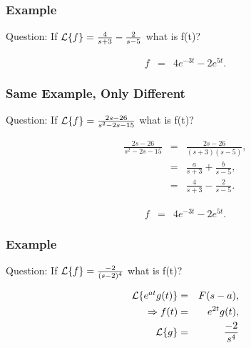 \begin{frame}
  \frametitle{Example}

  \begin{block}{Question:}
    If $\laplace{f} = \frac{4}{s+3}-\frac{2}{s-5}$ what is f(t)?
  \end{block}

  {
    \begin{eqnarray*}
      f & = & 4 e^{-3t} - 2 e^{5t}.
    \end{eqnarray*}
  }

\end{frame}


\begin{frame}
  \frametitle{Same Example, Only Different}

  \begin{block}{Question:}
    If $\laplace{f} = \frac{2s-26}{s^2-2s-15}$ what is f(t)?
  \end{block}

  {
    \begin{eqnarray*}
      \frac{2s-26}{s^2-2s-15} & = & \frac{2s-26}{(s+3)(s-5)}, \\
      & = & \frac{a}{s+3} + \frac{b}{s-5}, \\
      & = & \frac{4}{s+3} - \frac{2}{s-5}.
    \end{eqnarray*}
  }

  {
    \begin{eqnarray*}
      f & = & 4 e^{-3t} - 2 e^{5t}.
    \end{eqnarray*}
  }


\end{frame}


\begin{frame}
  \frametitle{Example}

  \begin{block}{Question:}
    If $\laplace{f} = \frac{-2}{(s-2)^4}$ what is f(t)?
  \end{block}

  {
    \begin{eqnarray*}
      \laplace{e^{at}g(t)} & = & F(s-a), \\
      \Rightarrow f(t) & = & e^{2t} g(t), \\
      \laplace{g} & = & \frac{-2}{s^4}
    \end{eqnarray*}
  }



\end{frame}


